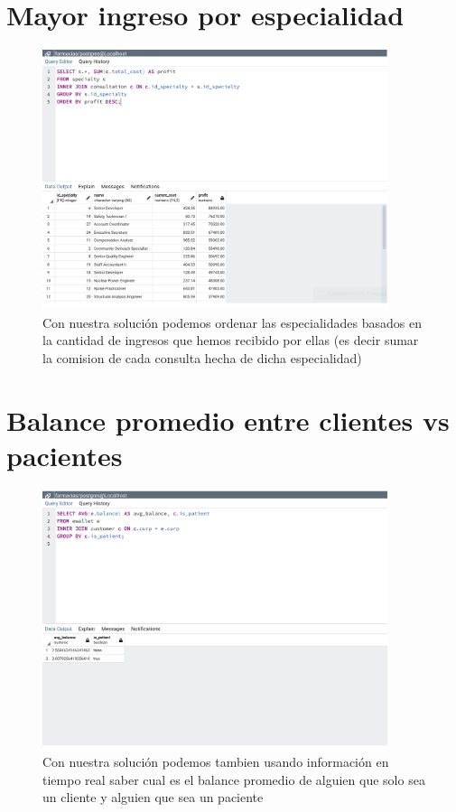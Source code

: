 \documentclass[12pt, fleqn]{report}                             %
\theoremstyle{break}                                            %
\begin{document}
        \clearpage
        \section{Mayor ingreso por especialidad}
            
            \begin{figure}[ht]
                \includegraphics[width=0.9\textwidth]{6}
                \caption{Con nuestra solución podemos ordenar las especialidades basados en la cantidad de ingresos que hemos
                recibido por ellas (es decir sumar la comision de cada consulta hecha de dicha especialidad)}
            \end{figure}

        \clearpage
        \section{Balance promedio entre clientes vs pacientes}
            
            \begin{figure}[ht]
                \includegraphics[width=0.9\textwidth]{7}
                \caption{Con nuestra solución podemos tambien usando información en tiempo real saber cual es el balance promedio
                de alguien que solo sea un cliente y alguien que sea un paciente}
            \end{figure}
\end{document}
